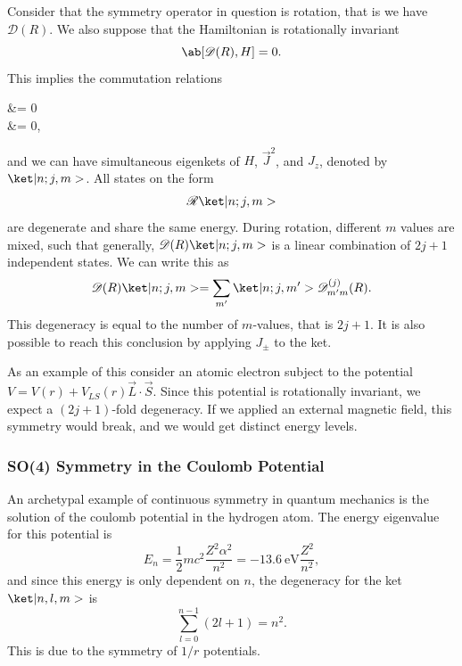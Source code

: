 Consider that the symmetry operator in question is rotation, that is we have $\mathscr{D}(R)$. We also suppose that the Hamiltonian is rotationally invariant
\begin{equation}
    \comm{\mathscr{D}(R)}{H} = 0.
\end{equation}
This implies the commutation relations
\begin{alphaAlign}
     &= 0\\
     &= 0,
\end{alphaAlign}
and we can have simultaneous eigenkets of $H$, $\vec{J}^2$, and $J_z$, denoted by $\k{n; j, m}$. All states on the form
\begin{equation}
    \mathscr{R} \k{n; j, m}
\end{equation}
are degenerate and share the same energy. During rotation, different $m$ values are mixed, such that generally, $\mathscr{D}(R)\k{n; j, m}$ is a linear combination of $2j +1$ independent states. We can write this as
\begin{equation}
    \mathscr{D}(R)\k{n; j, m} = \sum_{m'} \k{n; j, m'} \mathscr{D}^{(j)}_{m'm}(R).
\end{equation}
This degeneracy is equal to the number of $m$-values, that is $2j+1$. It is also possible to reach this conclusion by applying $J_\pm$ to the ket.

As an example of this consider an atomic electron subject to the potential $V = V(r) + V_{LS}(r) \vec{L} \cdot \vec{S}$. Since this potential is rotationally invariant, we expect a $(2j+1)$-fold degeneracy. If we applied an external magnetic field, this symmetry would break, and we would get distinct energy levels. 

\subsubsection{SO(4) Symmetry in the Coulomb Potential}
An archetypal example of continuous symmetry in quantum mechanics is the solution of the coulomb potential in the hydrogen atom. The energy eigenvalue for this potential is
\begin{equation}
    E_n = \frac{1}{2} mc^2 \frac{Z^2 \alpha^2}{n^2} = \qty{-13.6}{\electronvolt} \frac{Z^2}{n^2},
\end{equation}
and since this energy is only dependent on $n$, the degeneracy for the ket $\k{n,l,m}$ is 
\begin{equation}
    \sum_{l=0}^{n-1}(2l+1) = n^2.
\end{equation}
This is due to the symmetry of $1/r$ potentials.

